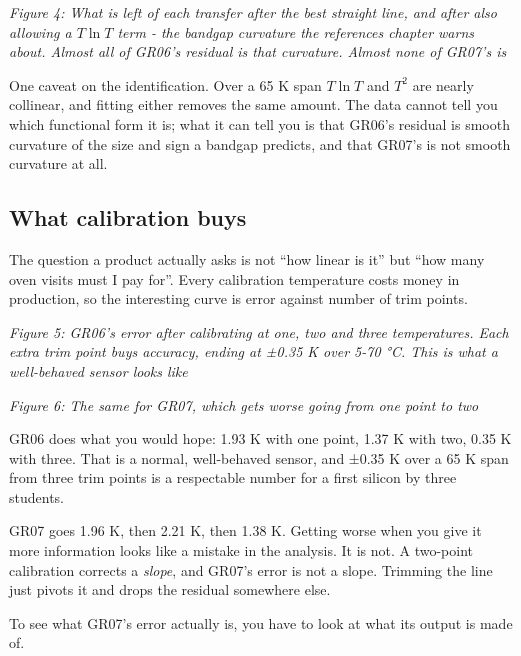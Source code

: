 {
\centering
{}
}

\emph{Figure 4: What is left of each transfer after the best straight
line, and after also allowing a \(T\ln T\) term - the bandgap curvature
the references chapter warns about. Almost all of GR06's residual is
that curvature. Almost none of GR07's is}

One caveat on the identification. Over a 65 K span \(T\ln T\) and
\(T^2\) are nearly collinear, and fitting either removes the same
amount. The data cannot tell you which functional form it is; what it
can tell you is that GR06's residual is smooth curvature of the size and
sign a bandgap predicts, and that GR07's is not smooth curvature at all.

\subsection{What calibration buys}\label{what-calibration-buys}

The question a product actually asks is not ``how linear is it'' but
``how many oven visits must I pay for''. Every calibration temperature
costs money in production, so the interesting curve is error against
number of trim points.


{
\centering
{}
}

\emph{Figure 5: GR06's error after calibrating at one, two and three
temperatures. Each extra trim point buys accuracy, ending at ±0.35 K
over 5-70 °C. This is what a well-behaved sensor looks like}


{
\centering
{}
}

\emph{Figure 6: The same for GR07, which gets \emph{worse} going from
one point to two}

GR06 does what you would hope: 1.93 K with one point, 1.37 K with two,
0.35 K with three. That is a normal, well-behaved sensor, and ±0.35 K
over a 65 K span from three trim points is a respectable number for a
first silicon by three students.

GR07 goes 1.96 K, then 2.21 K, then 1.38 K. Getting worse when you give
it more information looks like a mistake in the analysis. It is not. A
two-point calibration corrects a \emph{slope}, and GR07's error is not a
slope. Trimming the line just pivots it and drops the residual somewhere
else.

To see what GR07's error actually is, you have to look at what its
output is made of.

